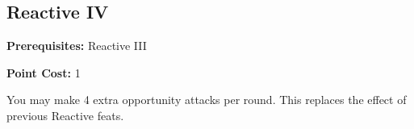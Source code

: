 \subsection{Reactive IV}\label{feat:reactive4}

\noindent
\textbf{Prerequisites:} Reactive III

\noindent
\textbf{Point Cost:} 1

You may make 4 extra opportunity attacks per round. This replaces the effect
of previous Reactive feats.
